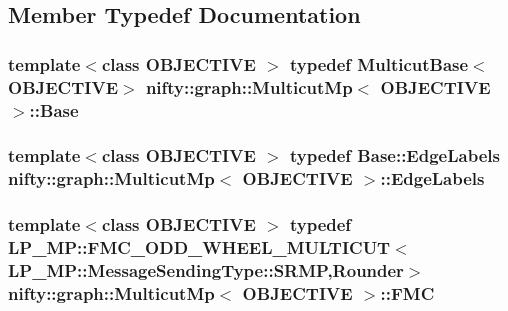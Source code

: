 \subsection{Member Typedef Documentation}
\hypertarget{classnifty_1_1graph_1_1MulticutMp_a736d0e61f4bd62aa9341791d2c888f28}{}
\subsubsection[{Base}]{\setlength{\rightskip}{0pt plus 5cm}template$<$class O\+B\+J\+E\+C\+T\+I\+V\+E $>$ typedef {\bf Multicut\+Base}$<$O\+B\+J\+E\+C\+T\+I\+V\+E$>$ {\bf nifty\+::graph\+::\+Multicut\+Mp}$<$ O\+B\+J\+E\+C\+T\+I\+V\+E $>$\+::{\bf Base}}\label{classnifty_1_1graph_1_1MulticutMp_a736d0e61f4bd62aa9341791d2c888f28}
\hypertarget{classnifty_1_1graph_1_1MulticutMp_aa141a402e0a46d60204f16ce0fef24ff}{}
\subsubsection[{Edge\+Labels}]{\setlength{\rightskip}{0pt plus 5cm}template$<$class O\+B\+J\+E\+C\+T\+I\+V\+E $>$ typedef {\bf Base\+::\+Edge\+Labels} {\bf nifty\+::graph\+::\+Multicut\+Mp}$<$ O\+B\+J\+E\+C\+T\+I\+V\+E $>$\+::{\bf Edge\+Labels}}\label{classnifty_1_1graph_1_1MulticutMp_aa141a402e0a46d60204f16ce0fef24ff}
\hypertarget{classnifty_1_1graph_1_1MulticutMp_a89b39a5447859b773cda4ec6ca0eb7ec}{}
\subsubsection[{F\+M\+C}]{\setlength{\rightskip}{0pt plus 5cm}template$<$class O\+B\+J\+E\+C\+T\+I\+V\+E $>$ typedef L\+P\+\_\+\+M\+P\+::\+F\+M\+C\+\_\+\+O\+D\+D\+\_\+\+W\+H\+E\+E\+L\+\_\+\+M\+U\+L\+T\+I\+C\+U\+T$<$L\+P\+\_\+\+M\+P\+::\+Message\+Sending\+Type\+::\+S\+R\+M\+P,{\bf Rounder}$>$ {\bf nifty\+::graph\+::\+Multicut\+Mp}$<$ O\+B\+J\+E\+C\+T\+I\+V\+E $>$\+::{\bf F\+M\+C}}\label{classnifty_1_1graph_1_1MulticutMp_a89b39a5447859b773cda4ec6ca0eb7ec}
\hypertarget{classnifty_1_1graph_1_1MulticutMp_a8e58eea9eaf877b4968c9a0a0eafea78}{}

